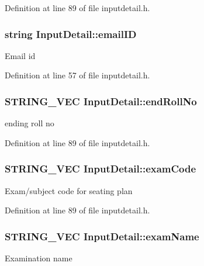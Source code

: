 Definition at line 89 of file inputdetail.\-h.

\hypertarget{classInputDetail_ad3f1db4fddbe0d4efbf1d5bc74d52257}{
\subsubsection[{email\-I\-D}]{\setlength{\rightskip}{0pt plus 5cm}string Input\-Detail\-::email\-I\-D\hspace{0.3cm}{\ttfamily [protected]}}}\label{classInputDetail_ad3f1db4fddbe0d4efbf1d5bc74d52257}
Email id 

Definition at line 57 of file inputdetail.\-h.

\hypertarget{classInputDetail_abc3249eab8fbf895620deff0a9349333}{
\subsubsection[{end\-Roll\-No}]{\setlength{\rightskip}{0pt plus 5cm}S\-T\-R\-I\-N\-G\-\_\-\-V\-E\-C Input\-Detail\-::end\-Roll\-No\hspace{0.3cm}{\ttfamily [protected]}}}\label{classInputDetail_abc3249eab8fbf895620deff0a9349333}
ending roll no 

Definition at line 89 of file inputdetail.\-h.

\hypertarget{classInputDetail_ac48c0170ce354d3cd188ddc2e83e2c67}{
\subsubsection[{exam\-Code}]{\setlength{\rightskip}{0pt plus 5cm}S\-T\-R\-I\-N\-G\-\_\-\-V\-E\-C Input\-Detail\-::exam\-Code\hspace{0.3cm}{\ttfamily [protected]}}}\label{classInputDetail_ac48c0170ce354d3cd188ddc2e83e2c67}
Exam/subject code for seating plan 

Definition at line 89 of file inputdetail.\-h.

\hypertarget{classInputDetail_a7b4e4a2a26f23da75d9928601a88a1d9}{
\subsubsection[{exam\-Name}]{\setlength{\rightskip}{0pt plus 5cm}S\-T\-R\-I\-N\-G\-\_\-\-V\-E\-C Input\-Detail\-::exam\-Name\hspace{0.3cm}{\ttfamily [protected]}}}\label{classInputDetail_a7b4e4a2a26f23da75d9928601a88a1d9}
Examination name 

